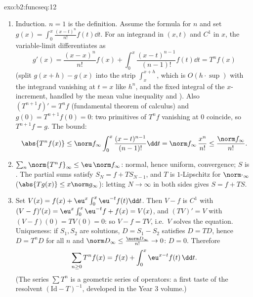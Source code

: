 \begin{solution}{exo:b2:funcseq:12}
\begin{enumerate}
  \item Induction. $n = 1$ is the definition. Assume the formula
        for $n$ and set $g(x) = \int_0^x \frac{(x-t)^n}{n!}
        f(t)\dd t$. For an integrand  in $(x,t)$ and
        $C^1$ in $x$, the variable-limit 
        differentiates as
        \[
        g'(x) = \frac{(x-x)^n}{n!}f(x)
        + \int_0^x \frac{(x-t)^{n-1}}{(n-1)!}f(t)\dd t
        = T^nf(x)
        \]
        (split $g(x+h) - g(x)$ into the strip
        $\int_x^{x+h}$, which is $O(h\cdot\sup)$ with the
        integrand vanishing at $t = x$ like $h^n$, and the fixed
        integral of the $x$-increment, handled by the mean value
        inequality and ). Also $(T^{n+1}f)' = T^nf$
        (fundamental theorem of calculus) and $g(0) =
        T^{n+1}f(0) = 0$: two primitives of $T^nf$ vanishing at
        $0$ coincide, so $T^{n+1}f = g$. The bound:
        \[
        \abs{T^nf(x)} \leq \norm f_\infty
        \int_0^x \frac{(x-t)^{n-1}}{(n-1)!}\dd t
        = \norm f_\infty\,\frac{x^n}{n!}
        \leq \frac{\norm f_\infty}{n!} .
        \]
  \item $\sum_n \norm{T^nf}_\infty \leq \eu\,\norm f_\infty$:
        normal, hence uniform, convergence; $S$ is .
        The partial sums satisfy $S_N = f + T S_{N-1}$, and $T$
        is $1$-Lipschitz for $\norm\cdot_\infty$
        ($\abs{Tg(x)} \leq x\norm g_\infty$): letting $N \to
        \infty$ in both sides gives $S = f + TS$.
  \item Set $V(x) = f(x) + \eu^x\int_0^x \eu^{-t}f(t)\dd t$.
        Then $V - f$ is $C^1$ with $(V-f)'(x) =
        \eu^x\int_0^x\eu^{-t}f + f(x) = V(x)$, and $(TV)' = V$
        with $(V - f)(0) = TV(0) = 0$: so $V - f = TV$, i.e.\
        $V$ solves the equation. Uniqueness: if $S_1, S_2$ are
         solutions, $D = S_1 - S_2$ satisfies $D =
        TD$, hence $D = T^nD$ for all $n$ and $\norm D_\infty
        \leq \frac{\norm D_\infty}{n!} \to 0$: $D = 0$.
        Therefore
        \[
        \sum_{n\geq0} T^nf(x) = f(x) +
        \int_0^x \eu^{x-t}f(t)\,\dd t .
        \]
        (The series $\sum T^n$ is a geometric series of
        operators: a first taste of the resolvent
        $(\mathrm{Id} - T)^{-1}$, developed in the Year 3
        volume.)
\end{enumerate}
\end{solution}

